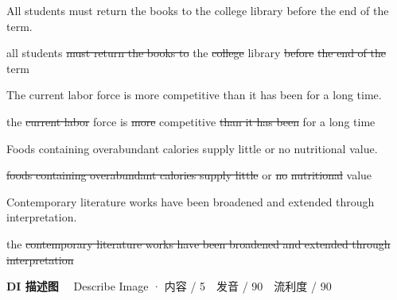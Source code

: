 \documentclass[11pt]{article}
\newcommand{\ptetask}[2]{%
  \needspace{4\baselineskip}\medskip
  \begin{tcolorbox}[enhanced, colback=cHead, colframe=cHead, sharp corners,
     left=12pt, right=12pt, top=5pt, bottom=5pt, boxrule=0pt]
    {\large\bfseries\color{white} #1}\ \ {\color{white!80} #2}
  \end{tcolorbox}\smallskip}
\newcommand{\sg}[1]{\textcolor{cSpkGood}{#1}}   %
\newcommand{\sy}[1]{\textcolor{cSpkOk}{#1}}     %
\newcommand{\smiss}[1]{\textcolor{cSpkBad}{\sout{#1}}}  %
\begin{document}
{\small All students must return the books to the college library before the end of the term.}\par {}\par\smallskip
\begin{asrbox}\sg{all students} \smiss{must return the books to} \sg{the} \smiss{college} \sg{library} \smiss{before} \smiss{the end of the} \sg{term}\end{asrbox}

{\small The current labor force is more competitive than it has been for a long time.}\par {}\par\smallskip
\begin{asrbox}\sg{the} \smiss{current labor} \sg{force is} \smiss{more} \sg{competitive} \smiss{than it has been} \sg{for} \sy{a} \sy{long} \sg{time}\end{asrbox}

{\small Foods containing overabundant calories supply little or no nutritional value.}\par {}\par\smallskip
\begin{asrbox}\smiss{foods containing overabundant calories supply little} \sg{or} \smiss{no} \smiss{nutritional} \sg{value}\end{asrbox}

{\small Contemporary literature works have been broadened and extended through interpretation.}\par {}\par\smallskip
\begin{asrbox}\sg{the} \smiss{contemporary literature works have been broadened and extended through interpretation}\end{asrbox}

\ptetask{DI 描述图}{Describe Image · 内容 / 5　发音 / 90　流利度 / 90}
\end{document}
